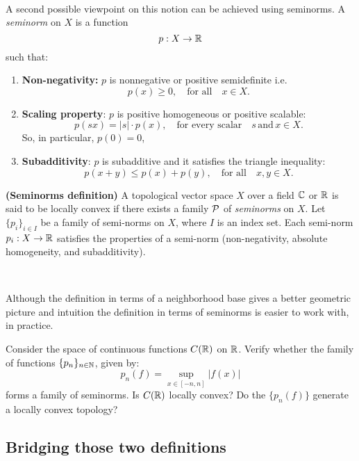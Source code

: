 \, 

A second possible viewpoint on this notion can be achieved using seminorms. A \emph{seminorm} on $X$ is a function \[p: X \to \mathbb{R}\] such that:

\begin{enumerate}
\item {\bf Non-negativity:} $p$ is nonnegative or positive semidefinite i.e. \[p(x)\geq 0,\quad \text{for all}\quad x\in X.\]

\item {\bf Scaling property}: $p$ is positive homogeneous or positive scalable: \[p(sx)=|s|\cdot p(x),\quad \text{for every scalar} \quad s \, \text{and}\, x\in X.\] So, in particular, $p(0)=0$,

\item {\bf Subadditivity}: $ p$ is subadditive and it satisfies the triangle inequality: \[p(x+y)\leq p(x)+p(y), \quad \text{for all}\quad x,y\in X.\]
\end{enumerate}

\begin{definition}{\bf (Seminorms definition)} A topological vector space $X$ over a field $\mathbb{C}$ or $\mathbb{R}$ is said to be locally convex if there exists a family $\mathcal{P}$ of \emph{seminorms} on $X$.
Let $\{p_i\}_{i\in I}$ be a family of semi-norms on 
$X$, where $I$ is an index set. Each semi-norm $p_i:X\to \mathbb{R}$ satisfies the properties of a semi-norm (non-negativity, absolute homogeneity, and subadditivity).
\end{definition}
\,

\begin{remark}
    Although the definition in terms of a neighborhood base gives a better geometric picture and intuition the definition in terms of seminorms is easier to work with, in practice.

\end{remark}
    
\begin{ex}\label{Ex:seminorm}
Consider the space of continuous functions $C(\mathbb{R})$ on $\mathbb{R}$. Verify whether the family of functions $\{p_n\}_{n\in \mathbb{N}}$,
given by: \[p_n(f)=\sup_{x\in [-n,n]}|f(x)|\] forms a family of seminorms.  
Is $C(\mathbb{R})$ locally convex? Do the $\{p_n(f)\}$ generate a locally convex topology?
\end{ex}
\subsection{Bridging those two definitions}

